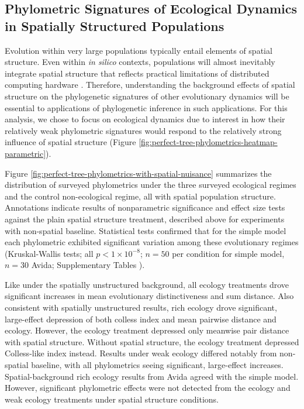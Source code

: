 \subsection{Phylometric Signatures of Ecological Dynamics in Spatially Structured Populations}



Evolution within very large populations typically entail elements of spatial structure.
Even within \textit{in silico} contexts, populations will almost inevitably integrate spatial structure that reflects practical limitations of distributed computing hardware \citep{ackley2014indefinitely,moreno2021conduit}.
Therefore, understanding the background effects of spatial structure on the phylogenetic signatures of other evolutionary dynamics will be essential to applications of phylogenetic inference in such applications.
For this analysis, we chose to focus on ecological dynamics due to interest in how their relatively weak phylometric signatures would respond to the relatively strong influence of spatial structure (Figure \ref{fig:perfect-tree-phylometrics-heatmap-parametric}).



Figure \ref{fig:perfect-tree-phylometrics-with-spatial-nuisance} summarizes the distribution of surveyed phylometrics under the three surveyed ecological regimes and the control non-ecological regime, all with spatial population structure.
Annotations indicate results of nonparametric significance and effect size tests against the plain spatial structure treatment, described above for experiments with non-spatial baseline.
Statistical tests confirmed that for the simple model each phylometric exhibited significant variation among these evolutionary regimes (Kruskal-Wallis tests; all $p < 1\times10^{-8}$; $n=50$ per condition for simple model, $n=30$ Avida; Supplementary Tables ).

Like under the spatially unstructured background, all ecology treatments drove significant increases in mean evolutionary distinctiveness and sum distance.
Also consistent with spatially unstructured results, rich ecology drove significant, large-effect depression of both colless index and mean pairwise distance and ecology.
However, the ecology treatment depressed only meanwise pair distance with spatial structure.
Without spatial structure, the ecology treatment depressed Colless-like index instead.
Results under weak ecology differed notably from non-spatial baseline, with all phylometrics seeing significant, large-effect increases.
Spatial-background rich ecology results from Avida agreed with the simple model.
However, significant phylometric effects were not detected from the ecology and weak ecology treatments under spatial structure conditions.


